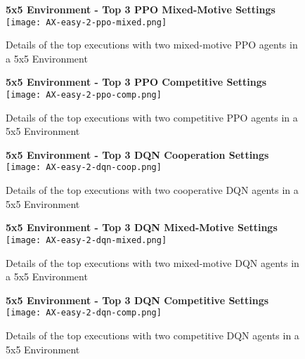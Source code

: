 \newpage
\vfill
\begin{figure}
    \centering
    \textbf{5x5 Environment - Top 3 PPO Mixed-Motive Settings}
    \texttt{[image: AX-easy-2-ppo-mixed.png]}\\
    \caption[Training Details of Top PPO Mixed-Motive Executions in a 5x5 Environment]{Details of the top executions with two mixed-motive PPO agents in a 5x5 Environment}\label{fig:ax-easy-2-ppo-mixed}
\end{figure}
\vfill
\clearpage

\newpage
\vfill
\begin{figure}
    \centering
    \textbf{5x5 Environment - Top 3 PPO Competitive Settings}
    \texttt{[image: AX-easy-2-ppo-comp.png]}\\
    \caption[Training Details of Top PPO Competitive Executions in a 5x5 Environment]{Details of the top executions with two competitive PPO agents in a 5x5 Environment}\label{fig:ax-easy-2-ppo-comp}
\end{figure}
\vfill
\clearpage

\newpage
\vfill
\begin{figure}
    \centering
    \textbf{5x5 Environment - Top 3 DQN Cooperation Settings}
    \texttt{[image: AX-easy-2-dqn-coop.png]}\\
    \caption[Training Details of Top DQN Cooperation Executions in a 5x5 Environment]{Details of the top executions with two cooperative DQN agents in a 5x5 Environment}\label{fig:ax-easy-2-dqn-coop}
\end{figure}
\vfill
\clearpage


\newpage
\vfill
\begin{figure}
    \centering
    \textbf{5x5 Environment - Top 3 DQN Mixed-Motive Settings}
    \texttt{[image: AX-easy-2-dqn-mixed.png]}\\
    \caption[Training Details of Top DQN Mixed-Motive Executions in a 5x5 Environment]{Details of the top executions with two mixed-motive DQN agents in a 5x5 Environment}\label{fig:ax-easy-2-dqn-mixed}
\end{figure}
\vfill
\clearpage

\newpage
\vfill
\begin{figure}
    \centering
    \textbf{5x5 Environment - Top 3 DQN Competitive Settings}
    \texttt{[image: AX-easy-2-dqn-comp.png]}\\
    \caption[Training Details of Top DQN Competitive Executions in a 5x5 Environment]{Details of the top executions with two competitive DQN agents in a 5x5 Environment}\label{fig:ax-easy-2-dqn-comp}
\end{figure}
\vfill
\clearpage

